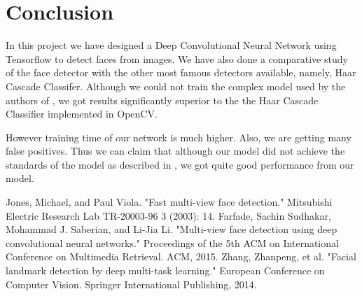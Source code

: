 \documentclass{article}
\begin{document}
\section{Conclusion}
In this project we have designed a Deep Convolutional Neural Network using Tensorflow to detect faces from images. We have also done a comparative study of the face detector with the other most famous detectors available, namely, Haar Cascade Classifer. Although we could not train the complex model used by the authors of \cite{paper}, we got results significantly superior to the the Haar Cascade Classifier implemented in OpenCV.\par
However training time of our network is much higher. Also, we are getting many false positives. Thus we can claim that although our model did not achieve the standards of the model as described in \cite{paper}, we got quite good performance from our model.
\begin{thebibliography}{99}
\setlength{\itemsep}{0\parskip}
Jones, Michael, and Paul Viola. "Fast multi-view face detection." Mitsubishi Electric Research Lab TR-20003-96 3 (2003): 14.
Farfade, Sachin Sudhakar, Mohammad J. Saberian, and Li-Jia Li. "Multi-view face detection using deep convolutional neural networks." Proceedings of the 5th ACM on International Conference on Multimedia Retrieval. ACM, 2015.
Zhang, Zhanpeng, et al. "Facial landmark detection by deep multi-task learning." European Conference on Computer Vision. Springer International Publishing, 2014.
\end{thebibliography}
\end{document}
